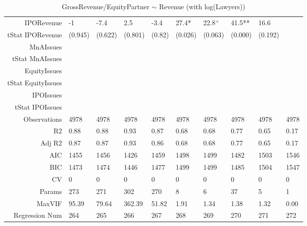 \begin{table}[ht]
\begin{tabular}{rlllllllll}
  IPORevenue & -1 & -7.4 & 2.5 & -3.4 & 27.4* & 22.8$^{+}$ & 41.5** & 16.6 &  \\ 
  tStat IPORevenue & (0.945) & (0.622) & (0.801) & (0.82) & (0.026) & (0.063) & (0.000) & (0.192) &  \\ 
  MnAIssues &  &  &  &  &  &  &  &  &  \\ 
  tStat MnAIssues &  &  &  &  &  &  &  &  &  \\ 
  EquityIssues &  &  &  &  &  &  &  &  &  \\ 
  tStat EquityIssues &  &  &  &  &  &  &  &  &  \\ 
  IPOIssues &  &  &  &  &  &  &  &  &  \\ 
  tStat IPOIssues &  &  &  &  &  &  &  &  &  \\ 
  Observations & 4978 & 4978 & 4978 & 4978 & 4978 & 4978 & 4978 & 4978 & 4978 \\ 
  R2 & 0.88 & 0.88 & 0.93 & 0.87 & 0.68 & 0.68 & 0.77 & 0.65 & 0.17 \\ 
  Adj R2 & 0.87 & 0.87 & 0.93 & 0.86 & 0.68 & 0.68 & 0.77 & 0.65 & 0.17 \\ 
  AIC & 1455 & 1456 & 1426 & 1459 & 1498 & 1499 & 1482 & 1503 & 1546 \\ 
  BIC & 1473 & 1474 & 1446 & 1477 & 1499 & 1499 & 1485 & 1504 & 1547 \\ 
  CV & 0 & 0 & 0 & 0 & 0 & 0 & 0 & 0 & 0 \\ 
  Params & 273 & 271 & 302 & 270 & 8 & 6 & 37 & 5 & 1 \\ 
  MaxVIF & 95.39 & 79.64 & 362.39 & 51.82 & 1.91 & 1.34 & 1.38 & 1.32 & 0.00 \\ 
  Regression Num & 264 & 265 & 266 & 267 & 268 & 269 & 270 & 271 & 272 \\ 
   \hline
\end{tabular}
\caption{GrossRevenue/EquityPartner $\sim$ Revenue (with log(Lawyers))} 
\end{table}
